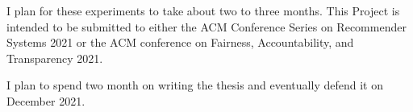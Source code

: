 \begin{itemize}
    
    I plan for these experiments to take about two to three months. This Project is intended to be submitted to either the ACM Conference Series on Recommender Systems 2021 or the ACM conference on Fairness, Accountability, and Transparency 2021.

    
\end{itemize}

I plan to spend two month on writing the thesis and eventually defend it on December 2021.





